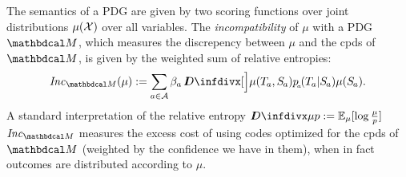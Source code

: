 \documentclass[twoside]{article}
\begin{document}
The semantics of a PDG are given by two scoring functions over joint distributions $\mu(\mathcal X)$ over all variables.
The \emph{incompatibility} of $\mu$ with a PDG $\dg M$, which
measures the discrepency between $\mu$ and the cpds of $\dg M$,
is given by the weighted sum of relative entropies:
\begin{align*}
    \Inc_{\dg M}(\mu) :=
        \sum_{a \in \Ar} \beta_a\, \kldiv[\Big]{\mu(\Tgt a,\Src a)}{p\ssub a(\Tgt a | \Src a) \mu(\Src a)}.
\end{align*}
A standard interpretation of the relative entropy $\kldiv{\mu}{p} := \Ex_{\mu}[\log \frac\mu p]$ 
$\Inc_{\dg M}$ measures the excess cost of using codes optimized for the cpds of $\dg M$ (weighted by the confidence we have in them), when in fact outcomes are distributed according to $\mu$.
\end{document}
